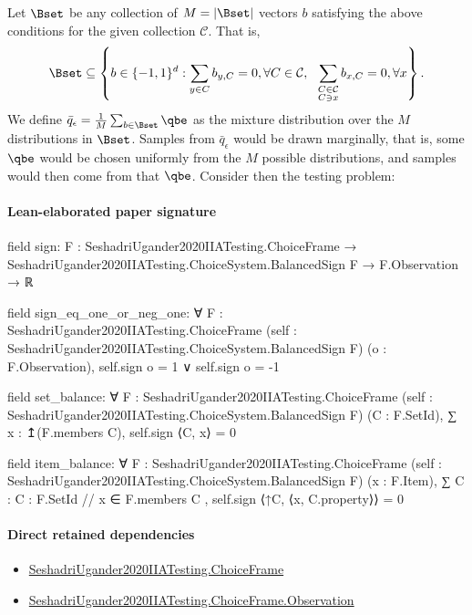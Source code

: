\documentclass[10pt]{article}
\begin{document}
\begin{ReviewVerbatim}
	Let $\Bset$ be any collection of $M=|\Bset|$ vectors $b$ satisfying the above conditions for the given collection $\mathcal C$. That is,
	\begin{align}
	\label{eq:bset_full}
	\Bset \subseteq
	\left \{
	b \in \lbrace -1, 1 \rbrace^d
	:
	\sum_{y \in C} b_{y,C} = 0, \forall C \in \mathcal C,
	\ \
	\sum_{\substack{C \in \mathcal{C}\\ C \ni x}} b_{x,C} = 0, \forall x
	\right \}.
	\end{align}
	We define $\bar{q}_\epsilon = \frac{1}{M} \sum_{b \in \Bset} \qbe$ as the mixture distribution over the $M$ distributions in $\Bset$. Samples from $\bar{q}_\epsilon$ would be drawn marginally, that is, some $\qbe$ would be chosen uniformly from the $M$ possible distributions, and samples would then come from that $\qbe$. Consider then the testing problem:
\end{ReviewVerbatim}



\paragraph{Lean-elaborated paper signature}
\begin{ReviewVerbatim}
field sign:
{F : SeshadriUgander2020IIATesting.ChoiceFrame} →
  SeshadriUgander2020IIATesting.ChoiceSystem.BalancedSign F → F.Observation → ℝ

field sign_eq_one_or_neg_one:
∀ {F : SeshadriUgander2020IIATesting.ChoiceFrame} (self : SeshadriUgander2020IIATesting.ChoiceSystem.BalancedSign F)
  (o : F.Observation), self.sign o = 1 ∨ self.sign o = -1

field set_balance:
∀ {F : SeshadriUgander2020IIATesting.ChoiceFrame} (self : SeshadriUgander2020IIATesting.ChoiceSystem.BalancedSign F)
  (C : F.SetId), ∑ x : ↥(F.members C), self.sign ⟨C, x⟩ = 0

field item_balance:
∀ {F : SeshadriUgander2020IIATesting.ChoiceFrame} (self : SeshadriUgander2020IIATesting.ChoiceSystem.BalancedSign F)
  (x : F.Item), ∑ C : { C : F.SetId // x ∈ F.members C }, self.sign ⟨↑C, ⟨x, C.property⟩⟩ = 0
\end{ReviewVerbatim}

\paragraph{Direct retained dependencies}
\begin{itemize}\raggedright
\item \hyperlink{paper-prerequisite-0b24d39c6f4d1898}{Seshadri\allowbreak{}Ugander2020\allowbreak{}IIA\allowbreak{}Testing.\allowbreak{}Choice\allowbreak{}Frame}
\item \hyperlink{paper-prerequisite-d450557e9618e377}{Seshadri\allowbreak{}Ugander2020\allowbreak{}IIA\allowbreak{}Testing.\allowbreak{}Choice\allowbreak{}Frame.\allowbreak{}Observation}
\end{itemize}
\end{document}
